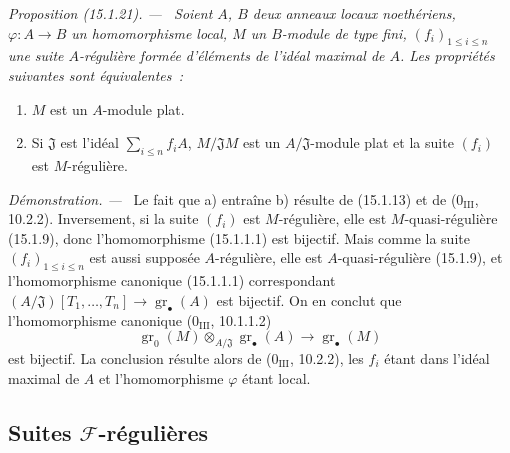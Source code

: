 \documentclass[10pt,oneside]{book}
\makeatletter
\newcommand{\gr}{\operatorname{gr}}
\newcommand{\setmanualcurrentlabel}[1]{\def\@currentlabel{#1}}
\newenvironment{proposition}[1][]{%
  \setmanualcurrentlabel{#1}\par\medskip\noindent\itshape Proposition (#1). ---\ }{\par}
\newenvironment{proof}{%
  \par\medskip\noindent\textit{Démonstration. ---\ }}{\par}
\makeatother
\begin{document}
\begin{proposition}[15.1.21]
\label{0.15.1.21-fr}
Soient $A$, $B$ deux anneaux locaux noethériens, $\varphi:A\to B$ un
homomorphisme local, $M$ un $B$-module de type fini, $(f_i)_{1\leq i\leq n}$
une suite $A$-régulière formée d'éléments de l'idéal maximal de $A$. Les
propriétés suivantes sont équivalentes~:
\begin{enumerate}
  \item[a)] $M$ est un $A$-module plat.
  \item[b)] Si $\mathfrak{J}$ est l'idéal $\sum_{i\leq n}f_iA$,
  $M/\mathfrak{J}M$ est un $A/\mathfrak{J}$-module plat et la suite $(f_i)$
  est $M$-régulière.
\end{enumerate}
\end{proposition}

\begin{proof}
Le fait que a) entraîne b) résulte de (15.1.13) et de
($0_{\mathrm{III}}$, 10.2.2). Inversement, si la suite $(f_i)$ est
$M$-régulière, elle est $M$-quasi-régulière (15.1.9), donc l'homomorphisme
(15.1.1.1) est bijectif. Mais comme la suite $(f_i)_{1\leq i\leq n}$ est aussi
supposée $A$-régulière, elle est $A$-quasi-régulière (15.1.9), et
l'homomorphisme canonique (15.1.1.1) correspondant
$(A/\mathfrak{J})[T_1,\ldots,T_n]\to\gr_\bullet(A)$ est bijectif. On en
conclut que l'homomorphisme canonique ($0_{\mathrm{III}}$, 10.1.1.2)
\[
  \gr_0(M)\otimes_{A/\mathfrak{J}}\gr_\bullet(A)
  \longrightarrow\gr_\bullet(M)
\]
est bijectif. La conclusion résulte alors de ($0_{\mathrm{III}}$, 10.2.2),
les $f_i$ étant dans l'idéal maximal de $A$ et l'homomorphisme $\varphi$ étant
local.
\end{proof}

\subsection{Suites \texorpdfstring{$\mathscr{F}$}{F}-régulières}
\label{subsection:0.15.2-fr}
\end{document}
